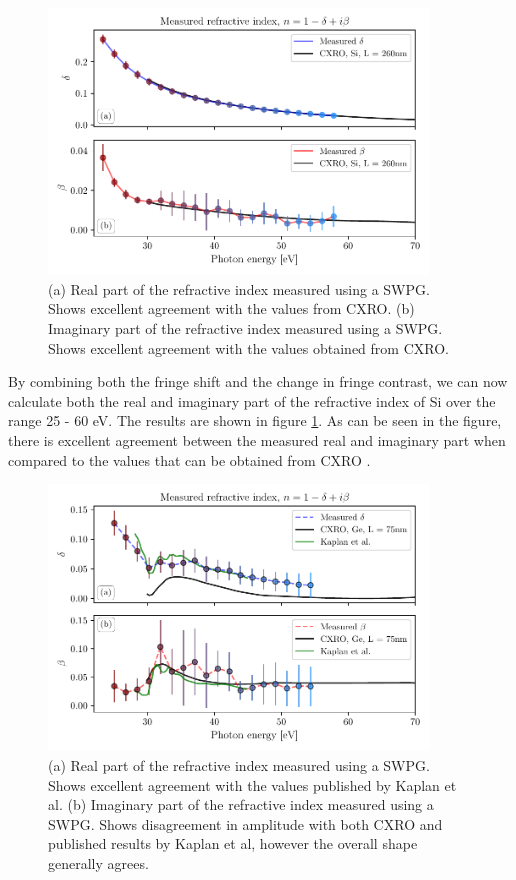 \begin{figure}
	\centering
	\includegraphics[width=0.9\textwidth]{figures/refractive_index/db_cxro.pdf}
	\caption[Measured real and imaginary part of the refractive index of Si]{(a) Real part of the refractive index measured using a SWPG.  Shows excellent agreement with the values from CXRO. (b) Imaginary part of the refractive index measured using a SWPG. Shows excellent agreement with the values obtained from CXRO.}
	\label{fig:measured_delta_beta}
\end{figure}
By combining both the fringe shift and the change in fringe contrast, we can now calculate both the real and imaginary part of the refractive index of Si over the range 25 - 60 eV.  The results are shown in figure \ref{fig:measured_delta_beta}.  As can be seen in the figure, there is excellent agreement between the measured real and imaginary part when compared to the values that can be obtained from CXRO \cite{henkeXRayInteractionsPhotoabsorption1993}.


\begin{figure}
	\centering
	\includegraphics[width=0.9\textwidth]{figures/refractive_index/ge_refractive.pdf}
	\caption[Measured real and imaginary part of the refractive index of Ge]{(a) Real part of the refractive index measured using a SWPG.  Shows excellent agreement with the values published by Kaplan et al.\cite{kaplanRetrievalComplexvaluedRefractive2019} (b) Imaginary part of the refractive index measured using a SWPG. Shows disagreement in amplitude with both CXRO and published results by Kaplan et al, however the overall shape generally agrees.}
	\label{fig:measured_delta_beta_ge}
\end{figure}


